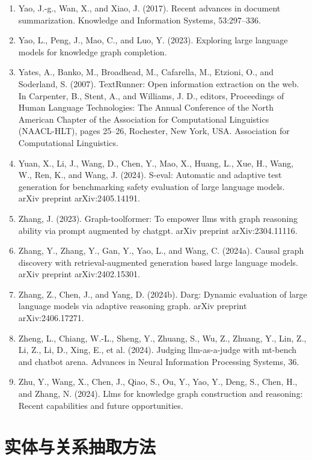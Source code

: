 \documentclass[11pt,UTF8,fontset=fandol]{ctexart}
\begin{document}
\begin{enumerate}[leftmargin=2em]
\item Yao, J.-g., Wan, X., and Xiao, J. (2017). Recent advances in document summarization. Knowledge and Information Systems, 53:297--336.
\item Yao, L., Peng, J., Mao, C., and Luo, Y. (2023). Exploring large language models for knowledge graph completion.
\item Yates, A., Banko, M., Broadhead, M., Cafarella, M., Etzioni, O., and Soderland, S. (2007). TextRunner: Open information extraction on the web. In Carpenter, B., Stent, A., and Williams, J. D., editors, Proceedings of Human Language Technologies: The Annual Conference of the North American Chapter of the Association for Computational Linguistics (NAACL-HLT), pages 25--26, Rochester, New York, USA. Association for Computational Linguistics.
\item Yuan, X., Li, J., Wang, D., Chen, Y., Mao, X., Huang, L., Xue, H., Wang, W., Ren, K., and Wang, J. (2024). S-eval: Automatic and adaptive test generation for benchmarking safety evaluation of large language models. arXiv preprint arXiv:2405.14191.
\item Zhang, J. (2023). Graph-toolformer: To empower llms with graph reasoning ability via prompt augmented by chatgpt. arXiv preprint arXiv:2304.11116.
\item Zhang, Y., Zhang, Y., Gan, Y., Yao, L., and Wang, C. (2024a). Causal graph discovery with retrieval-augmented generation based large language models. arXiv preprint arXiv:2402.15301.
\item Zhang, Z., Chen, J., and Yang, D. (2024b). Darg: Dynamic evaluation of large language models via adaptive reasoning graph. arXiv preprint arXiv:2406.17271.
\item Zheng, L., Chiang, W.-L., Sheng, Y., Zhuang, S., Wu, Z., Zhuang, Y., Lin, Z., Li, Z., Li, D., Xing, E., et al. (2024). Judging llm-as-a-judge with mt-bench and chatbot arena. Advances in Neural Information Processing Systems, 36.
\item Zhu, Y., Wang, X., Chen, J., Qiao, S., Ou, Y., Yao, Y., Deng, S., Chen, H., and Zhang, N. (2024). Llms for knowledge graph construction and reasoning: Recent capabilities and future opportunities.
\end{enumerate}

\appendix
\section{实体与关系抽取方法}
\end{document}
